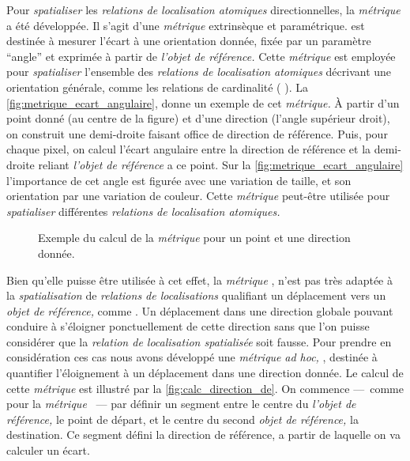 Pour \emph{spatialiser} les \emph{relations de localisation atomiques}
directionnelles, la \emph{métrique}  a été
développée. Il s'agit d'une \emph{métrique} extrinsèque et
paramétrique.  est destinée à mesurer l'écart à
une orientation donnée, fixée par un paramètre \enquote{angle} et
exprimée à partir de \emph{l'objet de référence.} Cette
\emph{métrique} est employée pour \emph{spatialiser} l'ensemble des
\emph{relations de localisation atomiques} décrivant une orientation
générale, comme les relations de cardinalité (\eg
{}). La \autoref{fig:metrique_ecart_angulaire},
donne un exemple de cet \emph{métrique.} À partir d'un point donné (au
centre de la figure) et d'une direction (l'angle supérieur droit), on
construit une demi-droite faisant office de direction de
référence. Puis, pour chaque pixel, on calcul l'écart angulaire entre
la direction de référence et la demi-droite reliant \emph{l'objet de
  référence} a ce point. Sur la \autoref{fig:metrique_ecart_angulaire}
l'importance de cet angle est figurée avec une variation de taille, et
son orientation par une variation de couleur. Cette \emph{métrique}
peut-être utilisée pour \emph{spatialiser} différentes \emph{relations
  de localisation atomiques.}

\begin{figure}
  \centering
  
  \caption{Exemple du calcul de la \emph{métrique}
    \protect{} pour un point et une direction
    donnée.}
  \label{fig:metrique_ecart_angulaire}
\end{figure}

Bien qu'elle puisse être utilisée à cet effet, la \emph{métrique}
, n'est pas très adaptée à la
\emph{spatialisation} de \emph{relations de localisations} qualifiant
un déplacement vers un \emph{objet de référence,} comme
. Un déplacement dans une direction
globale pouvant conduire à s'éloigner ponctuellement de cette
direction sans que l'on puisse considérer que la \emph{relation de
  localisation spatialisée} soit fausse. Pour prendre en considération
ces cas nous avons développé une \emph{métrique} \emph{ad hoc,}
, destinée à quantifier l'éloignement à un
déplacement dans une direction donnée. Le calcul de cette
\emph{métrique} est illustré par la
\autoref{fig:calc_direction_de}. On commence ---~comme pour la
\emph{métrique} ~--- par définir un segment
entre le centre du \emph{l'objet de référence,} le point de départ, et
le centre du second \emph{objet de référence,} la destination. Ce
segment défini la direction de référence, a partir de laquelle on va
calculer un écart.

